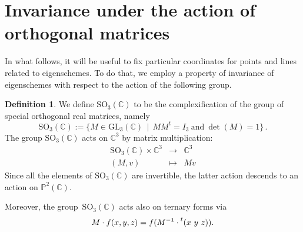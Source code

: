 \documentclass{amsart}
\theoremstyle{plain}
\theoremstyle{definition}
\newtheorem{definition}[lemma]{Definition}
\newcommand{\C}{\mathbb{C}}
\newcommand{\p}{\mathbb{P}}
\begin{document}
\section{Invariance under the action of orthogonal matrices}
\label{invariance}

In what follows, it will be useful to fix particular coordinates for points and lines related to eigenschemes. To do that, we employ a property of invariance of eigenschemes with respect to the action of the following group.

\begin{definition}
 We define $\mathrm{SO}_3(\mathbb{C})$ to be the complexification of the group of special orthogonal real matrices, namely
 \[
  \mathrm{SO}_3(\mathbb{C}) :=
  \bigl\{
   M \in \mathrm{GL}_3(\C) \, \mid \,
   M M^t = I_3 \  \text{and} \  \det(M) = 1
  \bigr\} \,.
 \]
 The group $\mathrm{SO}_3(\mathbb{C})$ acts on $\C^3$ by matrix multiplication:
 \[
  \begin{array}{ccc}
   \mathrm{SO}_3(\mathbb{C}) \times \C^3 & \rightarrow & \C^3 \\
   (M, v) & \mapsto & Mv
  \end{array}
 \]
 Since all the elements of $\mathrm{SO}_3(\mathbb{C})$ are invertible, the latter action descends to an action on $\p^2(\C)$.

 Moreover, the group~$\mathrm{SO}_3(\mathbb{C})$ acts also on ternary forms via
 \[
  M \cdot f (x,y,z) = f(M^{-1} \cdot \prescript{t} {}( x \ y \ z )  ).
 \]
\end{definition}
\end{document}

